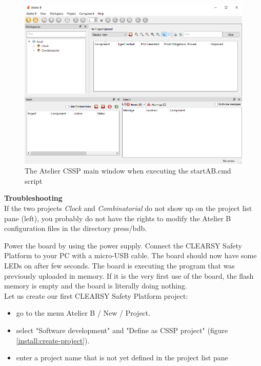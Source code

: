 \begin{figure}[h]
\centering\includegraphics[scale=0.35]{Pictures/chapterProgramming/INSTALL-ATB-window.png}
\caption{The Atelier CSSP main window when executing the startAB.cmd script}
\label{install:ATB-window}
\end{figure}

\begin{remark}
\textbf{Troubleshooting}\\
If the two projects \textit{Clock} and \textit{Combinatorial} do not show up on the project list pane (left), you probably  do not have the rights to modify the Atelier B configuration files in the directory press/bdb.
\end{remark}
Power the board by using the power supply. Connect the CLEARSY Safety Platform to your PC with a micro-USB cable.  The board should now have some LEDs on after few seconds. The board is executing the program that was previously uploaded in memory. If it is the very first use of the board, the flash memory is empty and the board is literally doing nothing.\\
Let us create our first CLEARSY Safety Platform project:
\begin{itemize}
    \item go to the menu Atelier B / New / Project.
    \item select "Software development" and "Define as CSSP project" (figure \ref{install:create-project}).
    \item enter a project name that is not yet defined in the project list pane
\end{itemize}

